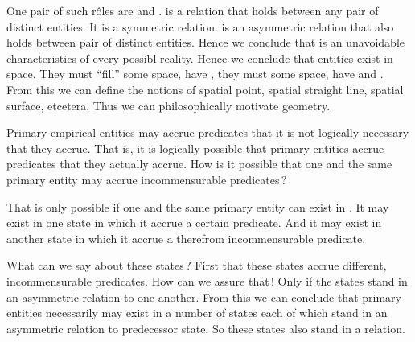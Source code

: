 \begynd
\pind One pair of such r{\^{o}}les are  and .
\begynd
\pind {} is a relation \nyl that holds between any pair of
      distinct entities.
\pind It is a symmetric relation.
\pind {} is an asymmetric relation \nyl that also holds
between  pair of
      distinct entities.
\afslut
\mnewfoil
\pind Hence we conclude that \nyl {} is an unavoidable
      characteristics of every possibl
      reality.
\begynd
\pind Hence we conclude that entities exist in space.
\pind They must ``fill'' some space, have ,
\pind they must  some space,
\pind have  and .
\pind From this we can define the notions of 
\begynd
\pind spatial point,
\pind  spatial straight line,
\pind  spatial surface,
\pind etcetera.
\afslut
\pind Thus we can philosophically motivate geometry.
\afslut
\afslut

\label{primer-filosofi-time}

\begynd
\pind Primary empirical entities \nyl may \ysfchgii{ } accrue predicates  \nyl that it is
      not logically necessary that they accrue.
\begynd
\pind That is, it is logically possible that primary entities  
\pind accrue predicates that they   actually accrue.
\pind How is it possible that one and the same primary entity \nyl may
      accrue incommensurable predicates\,?
\afslut
\afslut

\mnewfoil

\begynd
\pind That is only possible if one and the same primary entity can 
\pind exist in .
\begynd
\pind It may exist in one state in which it accrue a certain predicate.
\pind And it may exist in another state \nyl in which it accrue a therefrom
      incommensurable predicate.
\afslut
\afslut

\mnewfoil

\begynd
\pind What can we say about these states\,?
\begynd
\pind First that these states accrue different, \nyl incommensurable predicates.
\pind How can we assure that\,!
\pind Only if the states stand in an asymmetric relation to one another.
\pind From this we can conclude \nyl that primary entities necessarily \nyl
      may exist in a number of states 
\pind each of which stand \nyl  in an asymmetric relation to
      predecessor state.
\pind So these states also stand in a  relation.
\afslut
\afslut

